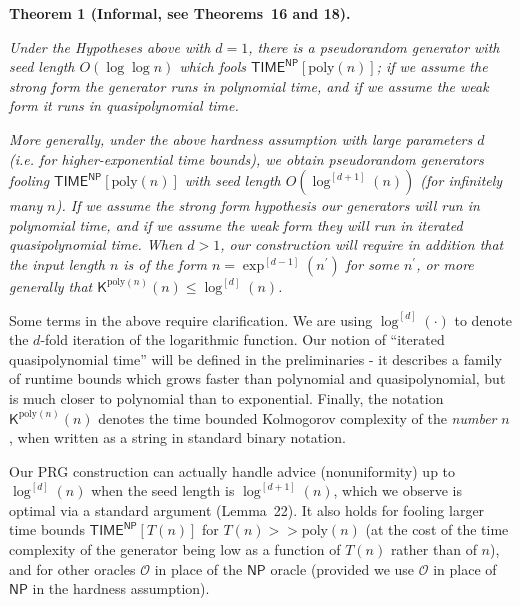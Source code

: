 

\par\medskip\noindent\textbf{
\textbf{Theorem 1}\textbf{ }(Informal, see Theorems 16 and 18)\textbf{.}
}\par



\emph{Under the Hypotheses above with $d=1$, there is a pseudorandom generator with seed length $O(\log\log n)$ which fools ${\mathsf{TIME}}^{{\mathsf{NP}}}[\mathrm{poly}(n)]$; if we assume the strong form the generator runs in polynomial time, and if we assume the weak form it runs in quasipolynomial time.}\par




\emph{More generally, under the above hardness assumption with large parameters $d$ (i.e. for higher-exponential time bounds), we obtain pseudorandom generators fooling ${\mathsf{TIME}}^{{\mathsf{NP}}}[\mathrm{poly}(n)]$ with seed length $O(\log^{[d+1]}(n))$ (for infinitely many $n$). If we assume the strong form hypothesis our generators will run in polynomial time, and if we assume the weak form they will run in iterated quasipolynomial time. When $d>1$, our construction will require in addition that the input length $n$ is of the form $n=\exp^{[d-1]}(n^{\prime})$ for some $n^{\prime}$, or more generally that ${\mathsf{K}}^{\mathrm{poly}(n)}(n)\leq\log^{[d]}(n)$.}\par






Some terms in the above require clarification. We are using $\log^{[d]}(\cdot)$ to denote the $d$-fold iteration of the logarithmic function.
Our notion of “iterated quasipolynomial time” will be defined in the preliminaries - it describes a family of runtime bounds which grows faster than polynomial and quasipolynomial, but is much closer to polynomial than to exponential. Finally, the notation ${\mathsf{K}}^{\mathrm{poly}(n)}(n)$ denotes the time bounded Kolmogorov complexity of the \emph{number} $n$, when written as a string in standard binary notation.\par




Our PRG construction can actually handle advice (nonuniformity) up to $\log^{[d]}(n)$ when the seed length is $\log^{[d+1]}(n)$, which we observe is optimal via a standard argument (Lemma 22). It also holds for fooling larger time bounds ${\mathsf{TIME}}^{\mathsf{NP}}[T(n)]$ for $T(n)>>\mathrm{poly}(n)$ (at the cost of the time complexity of the generator being low as a function of $T(n)$ rather than of $n$), and for other oracles $\mathcal{O}$ in place of the ${\mathsf{NP}}$ oracle (provided we use $\mathcal{O}$ in place of ${\mathsf{NP}}$ in the hardness assumption).\par




